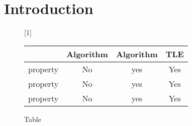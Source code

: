 \section{Introduction}
\label{sec:intro}
%


\begin{figure*}[!ht]
      
     \scalebox{1}[1]{
     \begin{tabularx}{\textwidth}{c|c|c|c}
	~~~~~ & Algorithm & Algorithm & TLE\\ \hline
	property & No & yes & Yes \\ \hline
	property & No & yes & Yes \\ \hline
	property & No & yes & Yes 
   \end{tabularx}
\caption{Table}\label{fig:main}    
}
\end{figure*}